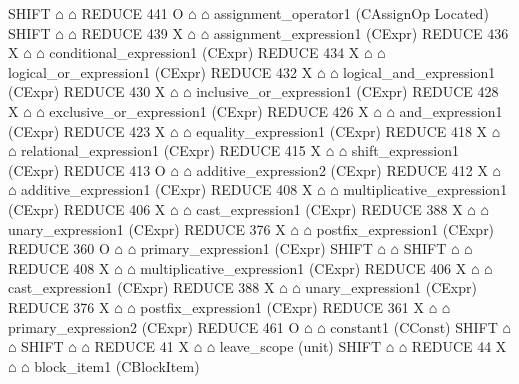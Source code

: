 \begin{isabellebody}
\begin{isamarkuptext}
\begin{isar}
                      SHIFT $\house$ $\house$ 
                   REDUCE 441 O $\house$ $\house$ assignment_operator1  (CAssignOp Located) 
                    SHIFT $\house$ $\house$ 
                   REDUCE 439 X $\house$ $\house$ assignment_expression1  (CExpr) 
                    REDUCE 436 X $\house$ $\house$ conditional_expression1  (CExpr) 
                     REDUCE 434 X $\house$ $\house$ logical_or_expression1  (CExpr) 
                      REDUCE 432 X $\house$ $\house$ logical_and_expression1  (CExpr) 
                       REDUCE 430 X $\house$ $\house$ inclusive_or_expression1  (CExpr) 
                        REDUCE 428 X $\house$ $\house$ exclusive_or_expression1  (CExpr) 
                         REDUCE 426 X $\house$ $\house$ and_expression1  (CExpr) 
                          REDUCE 423 X $\house$ $\house$ equality_expression1  (CExpr) 
                           REDUCE 418 X $\house$ $\house$ relational_expression1  (CExpr) 
                            REDUCE 415 X $\house$ $\house$ shift_expression1  (CExpr) 
                             REDUCE 413 O $\house$ $\house$ additive_expression2  (CExpr) 
                              REDUCE 412 X $\house$ $\house$ additive_expression1  (CExpr) 
                               REDUCE 408 X $\house$ $\house$ multiplicative_expression1  (CExpr) 
                                REDUCE 406 X $\house$ $\house$ cast_expression1  (CExpr) 
                                 REDUCE 388 X $\house$ $\house$ unary_expression1  (CExpr) 
                                  REDUCE 376 X $\house$ $\house$ postfix_expression1  (CExpr) 
                                   REDUCE 360 O $\house$ $\house$ primary_expression1  (CExpr) 
                                    SHIFT $\house$ $\house$ 
                              SHIFT $\house$ $\house$ 
                              REDUCE 408 X $\house$ $\house$ multiplicative_expression1  (CExpr) 
                               REDUCE 406 X $\house$ $\house$ cast_expression1  (CExpr) 
                                REDUCE 388 X $\house$ $\house$ unary_expression1  (CExpr) 
                                 REDUCE 376 X $\house$ $\house$ postfix_expression1  (CExpr) 
                                  REDUCE 361 X $\house$ $\house$ primary_expression2  (CExpr) 
                                   REDUCE 461 O $\house$ $\house$ constant1  (CConst) 
                                    SHIFT $\house$ $\house$ 
                 SHIFT $\house$ $\house$ 
             REDUCE 41 X $\house$ $\house$ leave_scope  (unit) 
             SHIFT $\house$ $\house$ 
       REDUCE 44 X $\house$ $\house$ block_item1  (CBlockItem) 

\end{isar}
\end{isamarkuptext}
\end{isabellebody}

